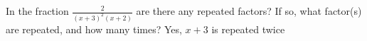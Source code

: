 {In the fraction $\displaystyle \frac{2}{(x+3)^2(x+2)}$ are there any repeated factors? If so, what factor(s) are repeated, and how many times?}
{Yes, $x+3$ is repeated twice}
